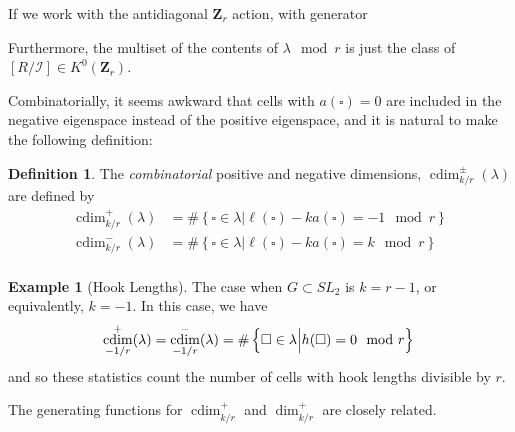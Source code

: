 \documentclass{amsart}[12pt]
\theoremstyle{definition}
\newtheorem{example}[dummy]{Example}
\newtheorem{definition}[dummy]{Definition}
\newcommand{\Z}{\mathbf{Z}}
\newcommand{\II}{\mathcal{I}}
\DeclareMathOperator{\cdim}{cdim}
\begin{document}
If we work with the antidiagonal $\Z_r$ action, with generator 

Furthermore, the multiset of the contents of $\lambda \mod r$ is just the class of $[R/\II]\in K^0(\Z_r)$.



Combinatorially, it seems awkward that cells with $a(\square)=0$ are included in the negative eigenspace instead of the positive eigenspace, and it is natural to make the following definition:
\begin{definition}
The \emph{combinatorial} positive and negative dimensions, $\cdim^\pm_{k/r}(\lambda)$ are defined by
\begin{align*}
\cdim^+_{k/r}(\lambda)&=\#\left\{\square\in\lambda \Big | \ell(\square)-k a(\square)=-1 \mod r\right\} \\
\cdim^-_{k/r}(\lambda)&=\#\left\{\square\in\lambda \Big | \ell(\square)-k a(\square)=k \mod r\right\} \\
\end{align*}
\end{definition}

\begin{example}[Hook Lengths]
The case when $G\subset SL_2$ is $k=r-1$, or equivalently, $k=-1$.  In this case, we have
$$\cdim^+_{-1/r}(\lambda)=\cdim^-_{-1/r}(\lambda)=\#\left\{\square\in\lambda \Big | h(\square)=0\mod r\right\} \\$$
and so these statistics count the number of cells with hook lengths divisible by $r$.
\end{example}

The generating functions for $\cdim^+_{k/r}$ and $\dim^+_{k/r}$ are closely related.
\end{document}
